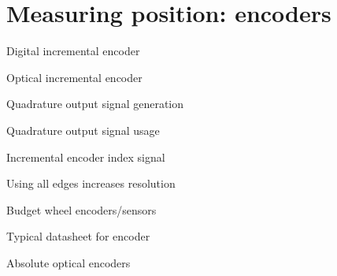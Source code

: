 \documentclass[compress]{beamer}
\begin{document}

\section[Encoders]{Measuring position: encoders}

{
    \begin{frame}{Digital incremental encoder}
    \end{frame}
}
{
    \begin{frame}{Optical incremental encoder}
    \end{frame}
}

{
    \begin{frame}{Quadrature output signal generation}
    \end{frame}
}

{
    \begin{frame}{Quadrature output signal usage}
    \end{frame}
}

{
    \begin{frame}{Incremental encoder index signal}
    \end{frame}
}

{
    \begin{frame}{Using all edges increases resolution}
    \end{frame}
}

{
    \begin{frame}{Budget wheel encoders/sensors}
    \end{frame}
}

{
    \begin{frame}{Typical datasheet for encoder}
    \end{frame}
}

{
    \begin{frame}{Absolute optical encoders}
    \end{frame}
}
\end{document}
